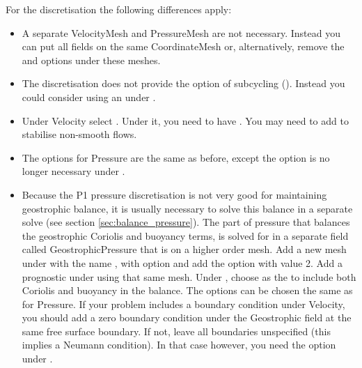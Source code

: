 For the \Poo discretisation the following differences apply:
\begin{itemize}
  \item A separate VelocityMesh and PressureMesh are not necessary. Instead you
    can put all fields on the same CoordinateMesh or, alternatively, remove the
     and  options under
    these meshes.
  \item The \Poo discretisation does not provide the option of subcycling
    (). Instead
    you could consider using an  under
    .
  \item Under Velocity select
    . Under it,
    you need to have . You may need
    to add  to stabilise non-smooth
    flows.
  \item The options for Pressure are the same as before, except the option
     is no longer necessary under
    .
  \item Because the P1 pressure discretisation is not very good for maintaining
    geostrophic balance, it is usually necessary to solve this balance in a
    separate solve (see section \ref{sec:balance_pressure}). The part of pressure that balances the geostrophic
    Coriolis and buoyancy terms, is solved for in a separate field called
    GeostrophicPressure that is on a higher order mesh. Add a new mesh under
     with the name , with
    option  and add
    the option  with value 2.
    Add a prognostic  under
     using that same mesh. Under
    , choose 
    as the  to include both Coriolis and
    buoyancy in the balance. The  options can be chosen
    the same as for Pressure. If your problem includes a
     boundary condition under Velocity, you should
    add a zero  boundary condition under the
    Geostrophic field at the same free surface boundary. If not, leave all
    boundaries unspecified (this implies a Neumann condition). In that case
    however, you need the option  under
    .
\end{itemize}


